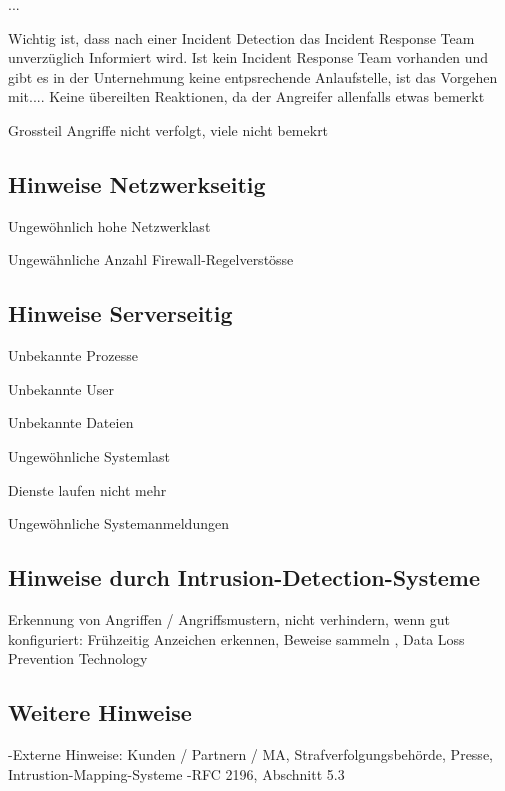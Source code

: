 ...

Wichtig ist, dass nach einer Incident Detection das Incident Response Team unverzüglich Informiert wird. Ist kein Incident Response Team vorhanden und gibt es in der Unternehmung keine entpsrechende Anlaufstelle, ist das Vorgehen mit....
Keine übereilten Reaktionen, da der Angreifer allenfalls etwas bemerkt

Grossteil Angriffe nicht verfolgt, viele nicht bemekrt

\subsection{Hinweise Netzwerkseitig}
\begin{itemize*}
  \item Ungewöhnlich hohe Netzwerklast
  \item Ungewähnliche Anzahl Firewall-Regelverstösse
\end{itemize*}

\subsection{Hinweise Serverseitig}
\begin{itemize*}
  \item Unbekannte Prozesse
  \item Unbekannte User
  \item Unbekannte Dateien
  \item Ungewöhnliche Systemlast
  \item Dienste laufen nicht mehr
  \item Ungewöhnliche Systemanmeldungen
\end{itemize*}

\subsection{Hinweise durch Intrusion-Detection-Systeme}
Erkennung von Angriffen / Angriffsmustern, nicht verhindern, wenn gut konfiguriert: Frühzeitig Anzeichen erkennen, Beweise sammeln
, Data Loss Prevention Technology

\subsection{Weitere Hinweise}
-Externe Hinweise: Kunden / Partnern / MA, Strafverfolgungsbehörde, Presse, Intrustion-Mapping-Systeme
-RFC 2196, Abschnitt 5.3

